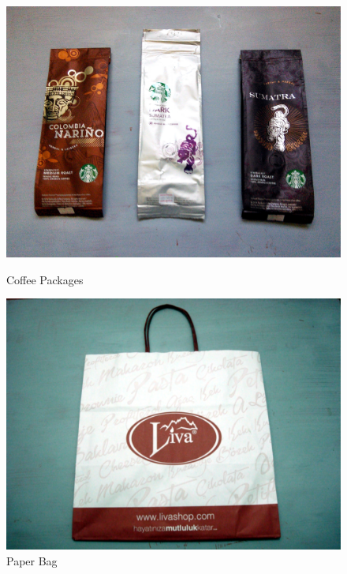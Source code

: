 \begin{figure}[!tbp]
  \centering
  \begin{minipage}[b]{0.48\textwidth}
    \includegraphics[width=\textwidth]{project_graphics/collected_coffee_packages.jpg}
    \caption{Coffee Packages}
    \label{fig:CoffeePackages}
  \end{minipage}
  \hfill
  \begin{minipage}[b]{0.48\textwidth}
    \includegraphics[width=\textwidth]{project_graphics/collected_liva.jpg}
    \caption{Paper Bag}
    \label{fig:LivaBag}
  \end{minipage}
\end{figure}


